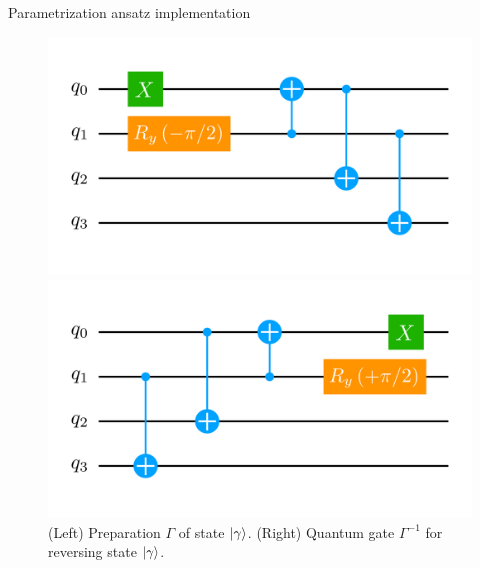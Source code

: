 \documentclass[9pt, handout, aspectratio=169]{beamer}	%
\begin{document}
\begin{frame}[allowframebreaks]{Parametrization ansatz implementation}
	\begin{figure}[!p]
		\centering
		\begin{minipage}[c]{.45\linewidth}
			\centering
			\includegraphics[width=\linewidth]{Figures/NJL1-model-solving/ansatz-implementation-base-state-preparation-gamma}
		\end{minipage}
	  \hspace{.025\linewidth}
		\begin{minipage}[c]{.45\linewidth}
			\centering
			\includegraphics[width=\linewidth]{Figures/NJL1-model-solving/ansatz-implementation-base-state-reversing-gamma}
		\end{minipage}
		\caption{(Left) Preparation $\Gamma$ of state $\ket{\gamma}$. (Right) Quantum gate $\Gamma^{-1}$ for reversing state $\ket{\gamma}$.}
	\end{figure}

\break


\end{frame}
\end{document}
